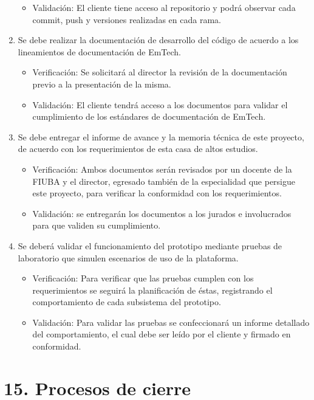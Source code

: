 \documentclass[
11pt, %
]{charter}
\begin{document}
\begin{enumerate}
\begin{itemize}
	        \item Validación: El cliente tiene acceso al repositorio y podrá observar cada commit, push y versiones realizadas en cada rama. 
            \end{itemize}
\item Se debe realizar la documentación de desarrollo del código de acuerdo a los lineamientos de documentación de EmTech. 
			\begin{itemize}
	        \item Verificación: Se solicitará al director la revisión de la documentación previo a la presentación de la misma.
	      \item Validación: El cliente tendrá acceso a los documentos para validar el cumplimiento de los estándares de documentación de EmTech. 
         \end{itemize}
\item Se debe entregar el informe de avance y la memoria técnica de este proyecto, de acuerdo con los requerimientos de esta casa de altos estudios.
			\begin{itemize}
	       \item Verificación: Ambos documentos serán revisados por un docente de la FIUBA y el director, egresado también de la especialidad que persigue este proyecto, para verificar la conformidad con los requerimientos. 
	       \item Validación: se entregarán los documentos a los jurados e involucrados para que validen su cumplimiento.
         \end{itemize}
\item Se deberá validar el funcionamiento del prototipo mediante pruebas de laboratorio que simulen escenarios de uso de la plataforma.
			\begin{itemize}
	       \item Verificación: Para verificar que las pruebas cumplen con los requerimientos se seguirá la planificación de éstas, registrando el comportamiento de cada subsistema del prototipo.
	       \item Validación: Para validar las pruebas se confeccionará un informe detallado del comportamiento, el cual debe ser leído por el cliente y firmado en conformidad. 
            \end{itemize}
			
\end{enumerate}

\newpage
\section{15. Procesos de cierre}    
\label{sec:cierre}
\end{document}
